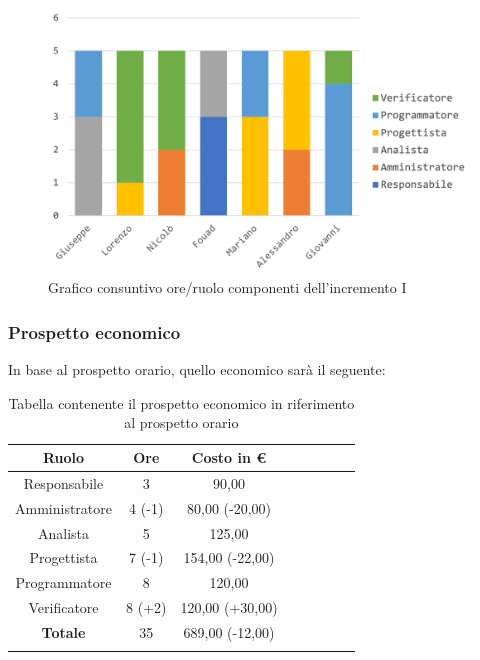 			\begin{figure}[H]
				\centering
				\includegraphics[width=0.8\linewidth]{images/consuntivo/ConsIncr1-1.png}
				\caption{Grafico consuntivo ore/ruolo componenti dell'incremento I}
				\label{fig:consuntivo grafico suddivione ruoli incremento I}
			\end{figure}
		
		\pagebreak
			
		\subsubsection{Prospetto economico}
			In base al prospetto orario, quello economico sarà il seguente: 
			
			\begin{longtable}{|c|c|c|c|c|c|c|c}
				\hline
				\rowcolor{lighter-grayer}
				\textbf{Ruolo} & \textbf{Ore} & \textbf{Costo in €} \\
				\hline
				\endfirsthead
				\hline
			Responsabile 	    & 3 & 90,00\\
			\hline 
			\hline
			Amministratore	  & 4 (-1)& 80,00 (-20,00)\\
			\hline
			\hline
			Analista 				& 5 & 125,00\\
			\hline
			\hline
			Progettista 		  & 7 (-1) & 154,00 (-22,00)\\
			\hline
			\hline
			Programmatore 	 & 8 & 120,00\\
			\hline
			\hline
			Verificatore 		  & 8 (+2) & 120,00 (+30,00)\\
			\hline
			\textbf{Totale} 	& 35 & 689,00 (-12,00)\\
			\hline
				
				\caption{Tabella contenente il prospetto economico in riferimento al prospetto orario}
			\end{longtable}
			
